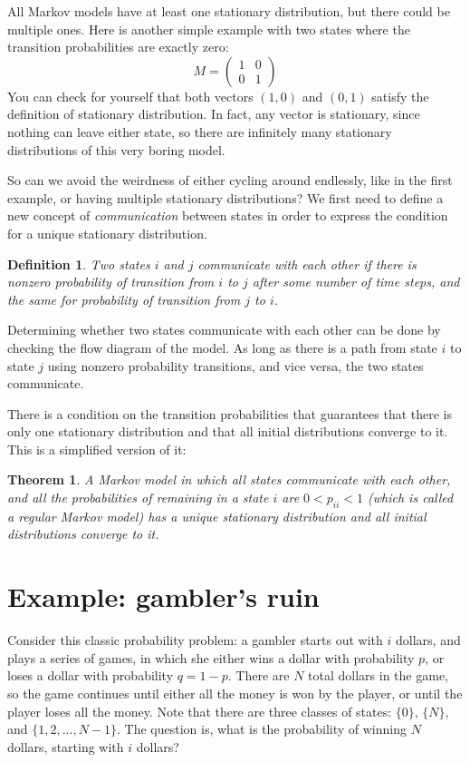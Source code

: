 \documentclass[11pt]{book}
\newtheorem{theorem}{Theorem}[chapter]
\newtheorem{mosdef}{Definition}[chapter]
\begin{document}
All Markov models have at least one stationary distribution, but there could be multiple ones. Here is another simple example with two states where the transition probabilities are exactly zero:
$$ M = \left(\begin{array}{cc} 1  & 0 \\  0 & 1 \end{array}\right)$$
You can check for yourself that both vectors $(1,0)$ and $(0,1)$ satisfy the definition of stationary distribution. In fact, any vector is stationary, since nothing can leave either state, so there are infinitely many stationary distributions of this very boring model.

So can we avoid the weirdness of either cycling around endlessly, like in the first example, or having multiple stationary distributions? We first need to define a new concept of \emph{communication} between states in order to express the condition for a unique stationary distribution.
\begin{mosdef}
Two states $i$ and $j$ \emph{communicate} with each other if there is nonzero probability of transition from $i$ to $j$ after some number of time steps, and the same for probability of transition from $j$ to $i$.
\end{mosdef}
Determining whether two states communicate with each other can be done by checking the flow diagram of the model. As long as there is a path from state $i$ to state $j$ using nonzero probability transitions, and vice versa, the two states communicate.

There is a condition on the transition probabilities that guarantees that there is only one stationary distribution and that all initial distributions converge to it. This is a simplified version of it:
\begin{theorem}
A Markov model in which all states communicate with each other, and all the probabilities of remaining in a state $i$ are $0<p_{ii}<1$ (which is called a \emph{regular} Markov model) has a unique stationary distribution and all initial distributions converge to it.
\end{theorem}


\section{Example: gambler's ruin}
Consider this classic probability problem: a gambler starts out with $i$ dollars, and plays a series of games, in which she either wins a dollar with probability $p$, or loses a dollar with probability $q = 1-p$. There are $N$ total dollars in the game, so the game continues until either all the money is won by the player, or until the player loses all the money. Note that there are three classes of states: $\{0\}$, $\{N\}$, and $\{1,2,..., N-1\}$. The question is, what is the probability of winning $N$ dollars, starting with $i$ dollars?
\end{document}
